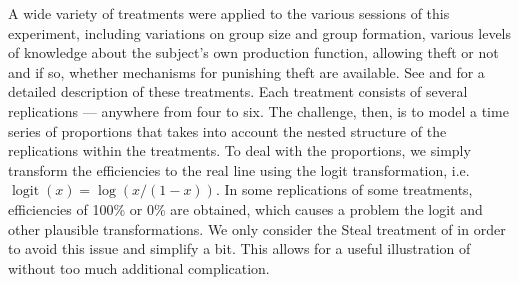 \documentclass[graybox]{svmult}
\DeclareMathOperator{\logit}{logit}
\begin{document}
A wide variety of treatments were applied to the various sessions of this experiment, including variations on group size and group formation, various levels of knowledge about the subject's own production function, allowing theft or not and if so, whether mechanisms for punishing theft are available. See \citet{crockett2009exchange} and \citet{kimbrough2010exchange} for a detailed description of these treatments. Each treatment consists of several replications --- anywhere from four to six. The challenge, then, is to model a time series of proportions that takes into account the nested structure of the replications within the treatments. To deal with the proportions, we simply transform the efficiencies to the real line using the logit transformation, i.e. $\logit(x)=\log(x/(1-x))$. In some replications of some treatments, efficiencies of 100\% or 0\% are obtained, which causes a problem the logit and other plausible transformations. We only consider the Steal treatment of \citet{kimbrough2010exchange} in order to avoid this issue and simplify a bit. This allows for a useful illustration of \citet{simpson2014interweaving} without too much additional complication. 
\end{document}
